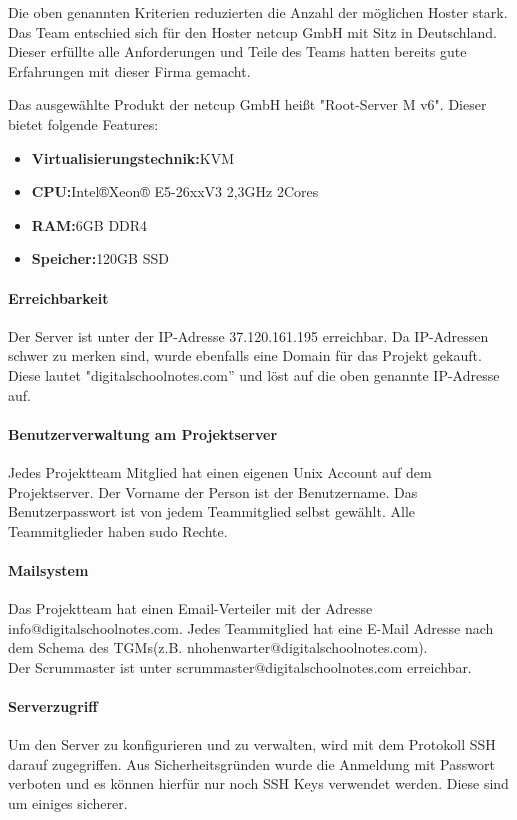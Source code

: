 Die oben genannten Kriterien reduzierten die Anzahl der möglichen Hoster stark. Das Team entschied sich für den Hoster netcup GmbH mit Sitz in Deutschland. Dieser erfüllte alle Anforderungen und Teile des Teams hatten bereits gute Erfahrungen mit dieser Firma gemacht.

Das ausgewählte Produkt der netcup GmbH heißt "Root-Server M v6". Dieser bietet folgende Features:
\begin{itemize}
\item \textbf{Virtualisierungstechnik:}\gls{KVM}
\item \textbf{CPU:}Intel®Xeon® E5-26xxV3 2,3GHz 2Cores
\item \textbf{RAM:}6GB DDR4
\item \textbf{Speicher:}120GB SSD
\end{itemize}

\paragraph{Erreichbarkeit}
Der Server ist unter der IP-Adresse 37.120.161.195 erreichbar. Da IP-Adressen schwer zu merken sind, wurde ebenfalls eine Domain für das Projekt gekauft. Diese lautet "digitalschoolnotes.com'' und löst auf die oben genannte IP-Adresse auf.

\paragraph{Benutzerverwaltung am Projektserver}
Jedes Projektteam Mitglied hat einen eigenen Unix Account auf dem Projektserver. Der Vorname der Person ist der Benutzername. Das Benutzerpasswort ist von jedem Teammitglied selbst gewählt. Alle Teammitglieder haben sudo Rechte. 

\paragraph{Mailsystem}
Das Projektteam hat einen Email-Verteiler mit der Adresse info@digitalschoolnotes.com. Jedes Teammitglied hat eine E-Mail Adresse nach dem Schema des \gls{TGM}s(z.B. nhohenwarter@digitalschoolnotes.com). \\
Der Scrummaster ist unter scrummaster@digitalschoolnotes.com erreichbar.

\paragraph{Serverzugriff}
Um den Server zu konfigurieren und zu verwalten, wird mit dem Protokoll \gls{SSH} darauf zugegriffen. Aus Sicherheitsgründen wurde die Anmeldung mit Passwort verboten und es können hierfür nur noch SSH Keys verwendet werden. Diese sind um einiges sicherer.

